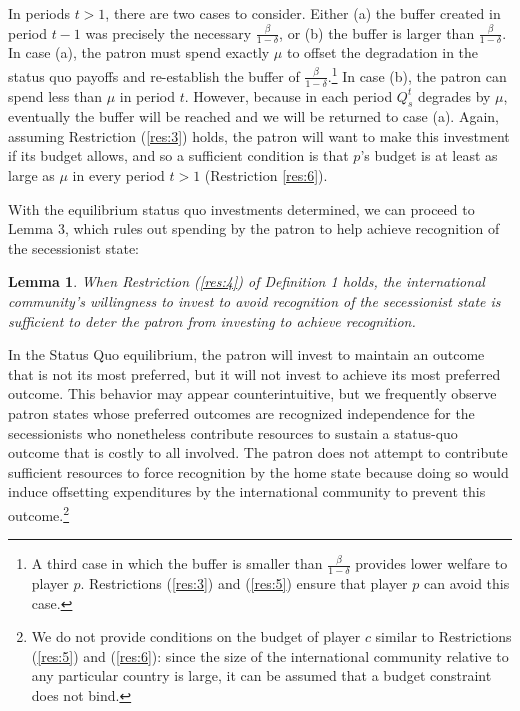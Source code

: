 \documentclass[11pt,letterpaper, notitlepage]{article}
\newtheorem{lemma}{Lemma}
\newcommand{\de}{\delta}
\begin{document}
In periods $t > 1$, there are two cases to consider. Either (a) the buffer created in period $t-1$ was precisely the necessary $\frac{\beta}{1-\de}$, or (b) the buffer is larger than $\frac{\beta}{1-\de}$. In case (a), the patron must spend exactly $\mu$ to offset the degradation in the status quo payoffs and re-establish the buffer of $\frac{\beta}{1-\de}$.\footnote{A third case in which the buffer is smaller than $\frac{\beta}{1-\de}$ provides lower welfare to player $p$. Restrictions (\ref{res:3}) and (\ref{res:5}) ensure that player $p$ can avoid this case.} In case (b), the patron can spend less than $\mu$ in period $t$. However, because in each period $Q_s^t$ degrades by $\mu$, eventually the buffer will be reached and we will be returned to case (a). Again, assuming Restriction (\ref{res:3}) holds, the patron will want to make this investment if its budget allows, and so a sufficient condition is that $p$'s budget is at least as large as $\mu$ in every period $t > 1$ (Restriction \ref{res:6}). 

With the equilibrium status quo investments determined, we can proceed to Lemma 3, which rules out spending by the patron to help achieve recognition of the secessionist state:

\begin{lemma}
When Restriction (\ref{res:4}) of Definition 1 holds, the international community's willingness to invest to avoid recognition of the secessionist state is sufficient to deter the patron from investing to achieve recognition.
\end{lemma}

In the Status Quo equilibrium, the patron will invest to maintain an outcome that is not its most preferred, but it will not invest to achieve its most preferred outcome. This behavior may appear counterintuitive, but we frequently observe patron states whose preferred outcomes are recognized independence for the secessionists who  nonetheless contribute resources to sustain a status-quo outcome that is costly to all involved. The patron does not attempt to contribute sufficient resources to force recognition by the home state because doing so would induce offsetting expenditures by the international community to prevent this outcome.\footnote{We do not provide conditions on the budget of player $c$ similar to Restrictions (\ref{res:5}) and (\ref{res:6}): since the size of the international community relative to any particular country is large, it can be assumed that a budget constraint does not bind.}
\end{document}
